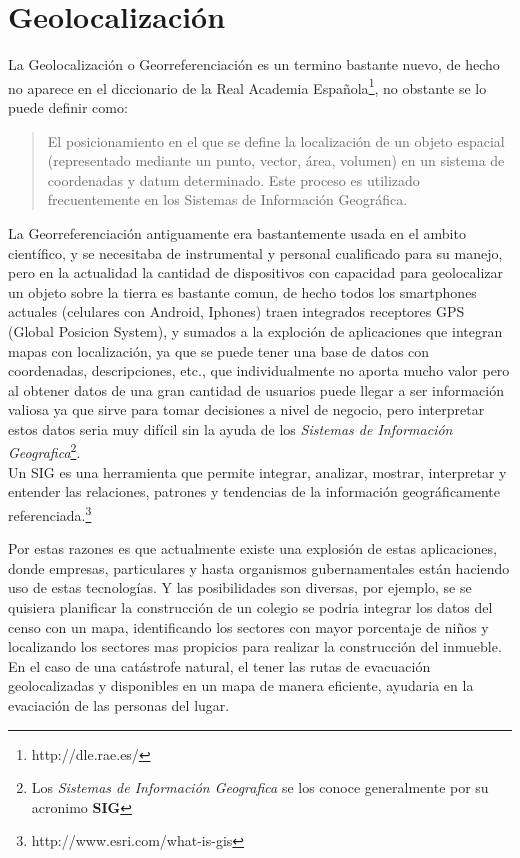 \chapter{Geolocalizaci\'on} %
\label{cha:geolocalizacion}
  La Geolocalizaci\'on o Georreferenciación es un termino bastante nuevo, de hecho no aparece en el diccionario de la Real Academia Espa\~nola\footnote{http://dle.rae.es/}, no obstante se lo puede definir como:

  \begin{quote}
    El posicionamiento en el que se define la localización de un objeto espacial (representado mediante un punto, vector, área, volumen) en un sistema de coordenadas y datum determinado. Este proceso es utilizado frecuentemente en los Sistemas de Información Geográfica.\cite{Georreferenciacion}
  \end{quote}


  La Georreferenciación antiguamente era bastantemente usada en el ambito científico, y se necesitaba de instrumental y personal cualificado para su manejo, pero en la actualidad la cantidad de dispositivos con capacidad para geolocalizar un objeto sobre la tierra es bastante comun, de hecho todos los smartphones actuales (celulares con Android, Iphones) traen integrados receptores GPS (Global Posicion System),  y sumados a la exploci\'on de aplicaciones  que integran mapas con localizaci\'on, ya que se puede tener una base de datos con coordenadas, descripciones, etc., que individualmente no aporta mucho valor pero al obtener datos de una gran cantidad de usuarios puede llegar a ser informaci\'on valiosa ya que sirve para tomar decisiones a nivel de negocio, pero interpretar estos datos seria muy difícil sin la ayuda de los \emph{Sistemas de Informaci\'on Geografica}\footnote{Los \emph{Sistemas de Informaci\'on Geografica} se los conoce generalmente por su acronimo \textbf{SIG}}.\\

  Un SIG es una herramienta que permite integrar, analizar, mostrar, interpretar y  entender las relaciones, patrones y tendencias de la información geográficamente referenciada.\footnote{http://www.esri.com/what-is-gis}

  Por estas razones es que actualmente existe una explosi\'on de estas aplicaciones, donde empresas, particulares y hasta organismos gubernamentales est\'an haciendo uso de estas tecnologías.
  Y las posibilidades son diversas, por ejemplo, se se quisiera planificar la construcci\'on de un colegio se podria integrar los datos del censo con un mapa, identificando los sectores con mayor porcentaje de ni\~nos y localizando los sectores mas propicios para realizar la construcción del inmueble. En el caso de una catástrofe natural, el tener las rutas de evacuaci\'on geolocalizadas y disponibles en un mapa de manera eficiente,  ayudaria en la evaciaci\'on de las personas del lugar.\\


